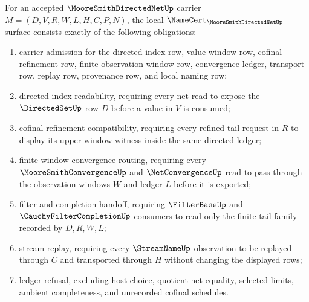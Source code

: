 \begin{theorem}\label{thm:moore-smith-directed-net-namecert-obligations}
For an accepted $\MooreSmithDirectedNetUp$ carrier $M=(D,V,R,W,L,H,C,P,N)$, the local $\NameCert_{\MooreSmithDirectedNetUp}$ surface consists exactly of the following obligations:
\begin{enumerate}
\item carrier admission for the directed-index row, value-window row, cofinal-refinement row, finite observation-window row, convergence ledger, transport row, replay row, provenance row, and local naming row;
\item directed-index readability, requiring every net read to expose the $\DirectedSetUp$ row $D$ before a value in $V$ is consumed;
\item cofinal-refinement compatibility, requiring every refined tail request in $R$ to display its upper-window witness inside the same directed ledger;
\item finite-window convergence routing, requiring every $\MooreSmithConvergenceUp$ and $\NetConvergenceUp$ read to pass through the observation windows $W$ and ledger $L$ before it is exported;
\item filter and completion handoff, requiring $\FilterBaseUp$ and $\CauchyFilterCompletionUp$ consumers to read only the finite tail family recorded by $D,R,W,L$;
\item stream replay, requiring every $\StreamNameUp$ observation to be replayed through $C$ and transported through $H$ without changing the displayed rows;
\item ledger refusal, excluding host choice, quotient net equality, selected limits, ambient completeness, and unrecorded cofinal schedules.
\end{enumerate}
\end{theorem}
